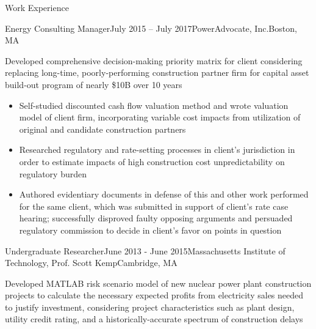 \documentclass{resume} %
\begin{document}
\begin{rSection}{Work Experience}
\begin{rSubsection}{Energy Consulting Manager}{July 2015 -- July 2017}{PowerAdvocate, Inc.}{Boston, MA}
  \setlength{\itemsep}{-5pt}
  \item Developed comprehensive decision-making priority matrix for client considering replacing long-time, poorly-performing construction partner firm for capital asset build-out program of nearly \$10B over 10 years
  \begin{itemize}
    \item Self-studied discounted cash flow valuation method and wrote valuation model of client firm, incorporating variable cost impacts from utilization of original and candidate construction partners
    \item Researched regulatory and rate-setting processes in client's jurisdiction in order to estimate impacts of high construction cost unpredictability on regulatory burden
    \item Authored evidentiary documents in defense of this and other work performed for the same client, which was submitted in support of client's rate case hearing; successfully disproved faulty opposing arguments and persuaded regulatory commission to decide in client's favor on points in question
  \end{itemize}
\end{rSubsection}


\begin{rSubsection}{Undergraduate Researcher}{June 2013 - June 2015}{Massachusetts Institute of Technology, Prof. Scott Kemp}{Cambridge, MA}
  \setlength{\itemsep}{-5pt}
  \item Developed MATLAB risk scenario model of new nuclear power plant construction projects to calculate the necessary expected profits from electricity sales needed to justify investment, considering project characteristics such as plant design, utility credit rating, and a historically-accurate spectrum of construction delays
\end{rSubsection}

\end{rSection}


\end{document}
